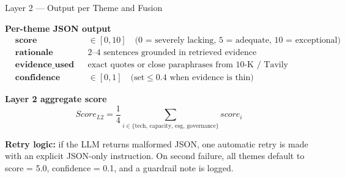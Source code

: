 \documentclass[aspectratio=169]{beamer}
\begin{document}
\begin{frame}{Layer 2 --- Output per Theme and Fusion}

\textbf{Per-theme JSON output}
\begin{align*}
&\textbf{score} && \in [0, 10] \quad \text{(0 = severely lacking, 5 = adequate, 10 = exceptional)} \\
&\textbf{rationale} && \text{2--4 sentences grounded in retrieved evidence} \\
&\textbf{evidence\_used} && \text{exact quotes or close paraphrases from 10-K / Tavily} \\
&\textbf{confidence} && \in [0, 1] \quad \text{(set} \leq 0.4 \text{ when evidence is thin)}
\end{align*}

\vspace{0.3cm}
\textbf{Layer 2 aggregate score}
\[
Score_{L2} = \frac{1}{4}\sum_{i \in \{\text{tech, capacity, esg, governance}\}} score_i
\]

\vspace{0.3cm}
\textbf{Retry logic:} if the LLM returns malformed JSON, one automatic retry is
made with an explicit JSON-only instruction. On second failure, all themes default
to score = 5.0, confidence = 0.1, and a guardrail note is logged.

\end{frame}
\end{document}
